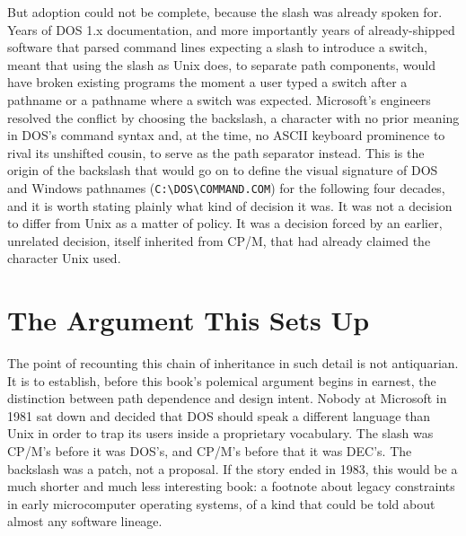 \documentclass[11pt]{book}
\begin{document}
But adoption could not be complete, because the slash was already spoken for. Years of DOS 1.x documentation, and more importantly years of already-shipped software that parsed command lines expecting a slash to introduce a switch, meant that using the slash as Unix does, to separate path components, would have broken existing programs the moment a user typed a switch after a pathname or a pathname where a switch was expected. Microsoft's engineers resolved the conflict by choosing the backslash, a character with no prior meaning in DOS's command syntax and, at the time, no ASCII keyboard prominence to rival its unshifted cousin, to serve as the path separator instead. This is the origin of the backslash that would go on to define the visual signature of DOS and Windows pathnames (\texttt{C:\textbackslash{}DOS\textbackslash{}COMMAND.COM}) for the following four decades, and it is worth stating plainly what kind of decision it was. It was not a decision to differ from Unix as a matter of policy. It was a decision forced by an earlier, unrelated decision, itself inherited from CP/M, that had already claimed the character Unix used.

\section{The Argument This Sets Up}

The point of recounting this chain of inheritance in such detail is not antiquarian. It is to establish, before this book's polemical argument begins in earnest, the distinction between path dependence and design intent. Nobody at Microsoft in 1981 sat down and decided that DOS should speak a different language than Unix in order to trap its users inside a proprietary vocabulary. The slash was CP/M's before it was DOS's, and CP/M's before that it was DEC's. The backslash was a patch, not a proposal. If the story ended in 1983, this would be a much shorter and much less interesting book: a footnote about legacy constraints in early microcomputer operating systems, of a kind that could be told about almost any software lineage.
\end{document}
